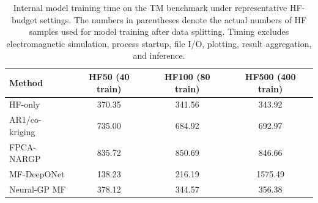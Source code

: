 
\begin{table}[t]
\centering
\caption{Internal model training time on the TM benchmark under representative HF-budget settings. The numbers in parentheses denote the actual numbers of HF samples used for model training after data splitting. Timing excludes electromagnetic simulation, process startup, file I/O, plotting, result aggregation, and inference.}
\label{tab:timing_main}
\begin{tabular}{lccc}
\toprule
Method & HF50 (40 train) & HF100 (80 train) & HF500 (400 train) \\
\midrule
HF-only & 370.35 & 341.56 & 343.92 \\
AR1/co-kriging & 735.00 & 684.92 & 692.97 \\
FPCA-NARGP & 835.72 & 850.69 & 846.66 \\
MF-DeepONet & 138.23 & 216.19 & 1575.49 \\
Neural-GP MF & 378.12 & 344.57 & 356.38 \\
\bottomrule
\end{tabular}
\end{table}
